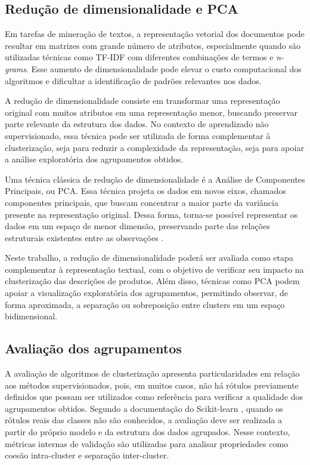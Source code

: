 \documentclass[english,brazilian]{UNISINOSmonografia}
\begin{document}
\subsection{Redução de dimensionalidade e PCA}

Em tarefas de mineração de textos, a representação vetorial dos documentos pode resultar em matrizes com grande número de atributos, especialmente quando são utilizadas técnicas como TF-IDF com diferentes combinações de termos e \textit{n-grams}. Esse aumento de dimensionalidade pode elevar o custo computacional dos algoritmos e dificultar a identificação de padrões relevantes nos dados.

A redução de dimensionalidade consiste em transformar uma representação original com muitos atributos em uma representação menor, buscando preservar parte relevante da estrutura dos dados. No contexto de aprendizado não supervisionado, essa técnica pode ser utilizada de forma complementar à clusterização, seja para reduzir a complexidade da representação, seja para apoiar a análise exploratória dos agrupamentos obtidos.

Uma técnica clássica de redução de dimensionalidade é a Análise de Componentes Principais, ou PCA. Essa técnica projeta os dados em novos eixos, chamados componentes principais, que buscam concentrar a maior parte da variância presente na representação original. Dessa forma, torna-se possível representar os dados em um espaço de menor dimensão, preservando parte das relações estruturais existentes entre as observações \cite{jolliffe2016pca}.

Neste trabalho, a redução de dimensionalidade poderá ser avaliada como etapa complementar à representação textual, com o objetivo de verificar seu impacto na clusterização das descrições de produtos. Além disso, técnicas como PCA podem apoiar a visualização exploratória dos agrupamentos, permitindo observar, de forma aproximada, a separação ou sobreposição entre clusters em um espaço bidimensional.











\subsection{Avaliação dos agrupamentos}

A avaliação de algoritmos de clusterização apresenta particularidades em relação aos métodos supervisionados, pois, em muitos casos, não há rótulos previamente definidos que possam ser utilizados como referência para verificar a qualidade dos agrupamentos obtidos. Segundo a documentação do Scikit-learn \cite{scikit-learn-clustering}, quando os rótulos reais das classes não são conhecidos, a avaliação deve ser realizada a partir do próprio modelo e da estrutura dos dados agrupados. Nesse contexto, métricas internas de validação são utilizadas para analisar propriedades como coesão intra-cluster e separação inter-cluster.
\end{document}
